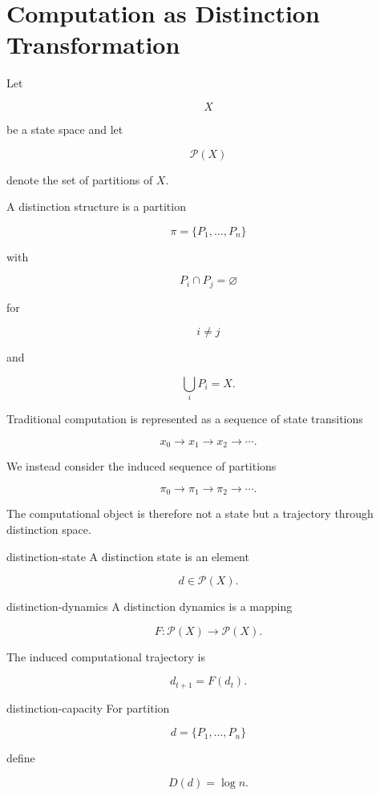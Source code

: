 \documentclass[12pt,twoside,openright]{book}
\begin{document}
\section{Computation as Distinction Transformation}

Let

\[
X
\]

be a state space and let

\[
\mathcal P(X)
\]

denote the set of partitions of \(X\).

A distinction structure is a partition

\[
\pi
=
\{P_1,\ldots,P_n\}
\]

with

\[
P_i\cap P_j=\varnothing
\]

for

\[
i\neq j
\]

and

\[
\bigcup_i P_i=X.
\]

Traditional computation is represented as a sequence of
state transitions

\[
x_0
\rightarrow
x_1
\rightarrow
x_2
\rightarrow
\cdots.
\]

We instead consider the induced sequence of partitions

\[
\pi_0
\rightarrow
\pi_1
\rightarrow
\pi_2
\rightarrow
\cdots.
\]

The computational object is therefore not a state but a
trajectory through distinction space.

\begin{definition}{distinction-state}
A distinction state is an element

\[
d
\in
\mathcal P(X).
\]
\end{definition}

\begin{definition}{distinction-dynamics}
A distinction dynamics is a mapping

\[
F :
\mathcal P(X)
\rightarrow
\mathcal P(X).
\]
\end{definition}

The induced computational trajectory is

\[
d_{t+1}
=
F(d_t).
\]

\begin{definition}{distinction-capacity}
For partition

\[
d
=
\{P_1,\ldots,P_n\}
\]

define

\[
D(d)
=
\log n.
\]
\end{definition}
\end{document}
